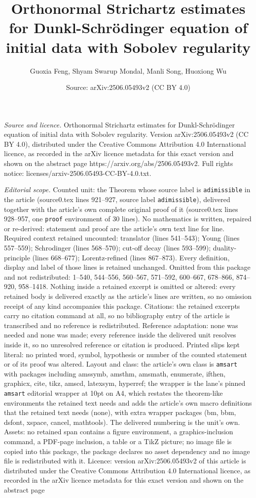 \documentclass[10pt,a4paper]{amsart}
\title[Orthonormal Strichartz estimates for Dunkl-Schr\"{o}dinger e]{Orthonormal Strichartz estimates for Dunkl-Schr\"{o}dinger equation of initial data with Sobolev regularity}
\author{Guoxia Feng, Shyam Swarup Mondal, Manli Song, Huoxiong Wu}
\date{Source: arXiv:2506.05493v2 (CC BY 4.0)}
\begin{document}
\maketitle

\noindent\emph{Source and licence.} Orthonormal Strichartz estimates for Dunkl-Schr\"{o}dinger equation of initial data with Sobolev regularity. Version arXiv:2506.05493v2 (CC BY 4.0), distributed under the Creative Commons Attribution 4.0 International licence, as recorded in the arXiv licence metadata for this exact version and shown on the abstract page https://arxiv.org/abs/2506.05493v2. Full rights notice: licenses/arxiv-2506.05493-CC-BY-4.0.txt.\par\smallskip

\noindent\textit{Editorial scope.} Counted unit: the Theorem whose source label is \texttt{adimissible} in the article (source0.tex lines 921--927, source label \texttt{adimissible}), delivered together with the article's own complete original proof of it (source0.tex lines 928--957, one \texttt{proof} environment of 30 lines). No mathematics is written, repaired or re-derived: statement and proof are the article's own text line for line. Required context retained uncounted: translator (lines 541--543); Young (lines 557--559); Schrodinger (lines 568--570); cut-off decay (lines 593--599); duality-principle (lines 668--677); Lorentz-refined (lines 867--873). Every definition, display and label of those lines is retained unchanged. Omitted from this package and not redistributed: 1--540, 544--556, 560--567, 571--592, 600--667, 678--866, 874--920, 958--1418. Nothing inside a retained excerpt is omitted or altered: every retained body is delivered exactly as the article's lines are written, so no omission receipt of any kind accompanies this package. Citations: the retained excerpts carry no citation command at all, so no bibliography entry of the article is transcribed and no reference is redistributed. Reference adaptation: none was needed and none was made; every reference inside the delivered unit resolves inside it, so no unresolved reference or citation is produced. Printed slips kept literal: no printed word, symbol, hypothesis or number of the counted statement or of its proof was altered. Layout and class: the article's own class is \texttt{amsart} with packages including amssymb, amsthm, amsmath, enumerate, ifthen, graphicx, cite, tikz, amscd, latexsym, hyperref; the wrapper is the lane's pinned \texttt{amsart} editorial wrapper at 10pt on A4, which restates the theorem-like environments the retained text needs and adds the article's own macro definitions that the retained text needs (none), with extra wrapper packages (bm, bbm, dsfont, xspace, cancel, mathtools). The delivered numbering is the unit's own. Assets: no retained span contains a figure environment, a graphics-inclusion command, a PDF-page inclusion, a table or a TikZ picture; no image file is copied into this package, the package declares no asset dependency and no image file is redistributed with it. Licence: version arXiv:2506.05493v2 of this article is distributed under the Creative Commons Attribution 4.0 International licence, as recorded in the arXiv licence metadata for this exact version and shown on the abstract page 
\end{document}
